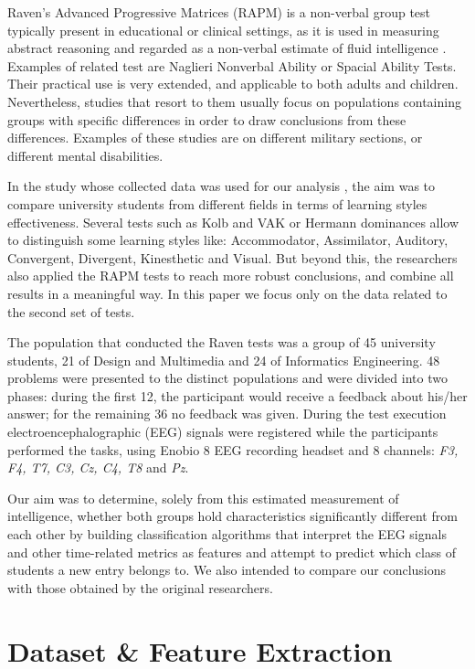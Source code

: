 \documentclass[conference]{IEEEtran}
\begin{document}
Raven's Advanced Progressive Matrices (RAPM) is a non-verbal group test 
typically present in educational or clinical settings, as it is used in 
measuring abstract reasoning and regarded as a non-verbal estimate of fluid 
intelligence \cite{rapm}.
Examples of related test are Naglieri Nonverbal Ability or Spacial Ability Tests.
Their practical use is very extended, and applicable to both adults and children.
Nevertheless, studies that resort to them usually focus on populations containing 
groups with specific differences in order to draw conclusions from these differences.
Examples of these studies are on different military sections, or different 
mental disabilities.

In the study whose collected data was used for our analysis \cite{study}, the 
aim was to compare university students from different fields in terms of 
learning styles effectiveness.
Several tests such as Kolb and VAK or Hermann dominances allow to distinguish
some learning styles like: Accommodator, Assimilator, Auditory, Convergent,
Divergent, Kinesthetic and Visual.
But beyond this, the researchers also applied the RAPM tests to reach more 
robust conclusions, and combine all results in a meaningful way.
In this paper we focus only on the data related to the second set of tests.

The population that conducted the Raven tests was a group of 45 university 
students, 21 of Design and Multimedia and 24 of Informatics Engineering.
48 problems were presented to the distinct populations and were divided into 
two phases: during the first 12, the participant would receive a feedback about 
his/her answer; for the remaining 36 no feedback was given.
During the test execution electroencephalographic (EEG) signals were registered 
while the participants performed the tasks, using Enobio 8 EEG recording headset 
and 8 channels: \textit{F3, F4, T7, C3, Cz, C4, T8} and \textit{Pz}.

Our aim was to determine, solely from this estimated measurement of intelligence,
whether both groups hold characteristics significantly different from each other
by building classification algorithms that interpret the EEG signals and other 
time-related metrics as features and attempt to predict which class of students
a new entry belongs to.
We also intended to compare our conclusions with those obtained by the original
researchers.

\vspace{1pt}
\section{Dataset \& Feature Extraction}
\end{document}

